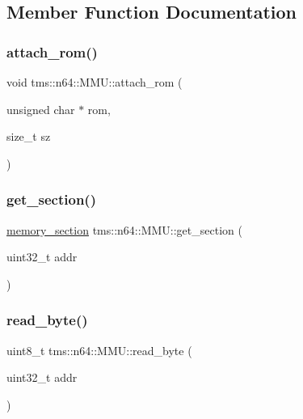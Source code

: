 \subsection{Member Function Documentation}
\mbox{\label{classtms_1_1n64_1_1_m_m_u_a8160b39c9cf0314ba2e3ea96774d8621}} 
\subsubsection{\texorpdfstring{attach\+\_\+rom()}{attach\_rom()}}
{\footnotesize\ttfamily void tms\+::n64\+::\+M\+M\+U\+::attach\+\_\+rom (\begin{DoxyParamCaption}\item[{unsigned char $\ast$}]{rom,  }\item[{size\+\_\+t}]{sz }\end{DoxyParamCaption})}

\mbox{\label{classtms_1_1n64_1_1_m_m_u_a749568ef68d32ff3fc14ef3bb2bbcb81}} 
\subsubsection{\texorpdfstring{get\+\_\+section()}{get\_section()}}
{\footnotesize\ttfamily \hyperlink{structtms_1_1n64_1_1memory__section}{memory\+\_\+section} tms\+::n64\+::\+M\+M\+U\+::get\+\_\+section (\begin{DoxyParamCaption}\item[{uint32\+\_\+t}]{addr }\end{DoxyParamCaption})\hspace{0.3cm}{\ttfamily [private]}}

\mbox{\label{classtms_1_1n64_1_1_m_m_u_a087d270b77e9fa8ddba70a1948f8544d}} 
\subsubsection{\texorpdfstring{read\+\_\+byte()}{read\_byte()}}
{\footnotesize\ttfamily uint8\+\_\+t tms\+::n64\+::\+M\+M\+U\+::read\+\_\+byte (\begin{DoxyParamCaption}\item[{uint32\+\_\+t}]{addr }\end{DoxyParamCaption})}

